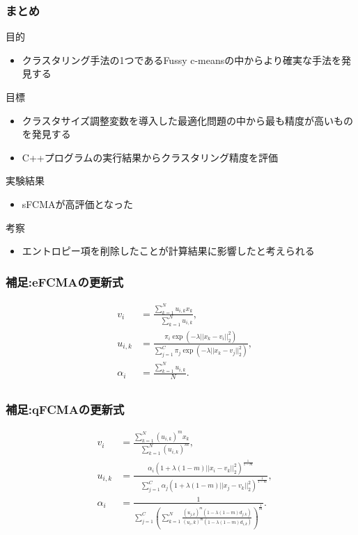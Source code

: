 \documentclass[13pt,dvipdfmx]{beamer}
\begin{document}
\begin{frame}\frametitle{まとめ}
  \begin{block}{目的}
    \begin{itemize}
    \item クラスタリング手法の1つであるFussy c-meansの中からより確実な手法を発見する
    \end{itemize}
  \end{block}
  \begin{block}{目標}
    \begin{itemize}
     \item クラスタサイズ調整変数を導入した最適化問題の中から最も精度が高いものを発見する
     \item C++プログラムの実行結果からクラスタリング精度を評価
    \end{itemize}
  \end{block}
  \begin{block}{実験結果}
    \begin{itemize}
    \item sFCMAが高評価となった
    \end{itemize}
  \end{block}
  \begin{block}{考察}
    \begin{itemize}
    \item エントロピー項を削除したことが計算結果に影響したと考えられる
    \end{itemize}
  \end{block}
\end{frame}

\begin{frame}\frametitle{補足:eFCMAの更新式}
   \begin{eqnarray*}
   &v_{i}& =\frac{\sum_{k=1}^Nu_{i,k}x_{k}}{\quad\sum_{k=1}^Nu_{i,k}},\\
   &u_{i,k}&=\frac{\pi_{i}\exp(-\lambda||x_k-v_i||_2^2)}{\sum_{j=1}^C\pi_{j}\exp(-\lambda||x_k-v_j||_2^2)},\\
   &\alpha_{i}&=\frac{\sum_{k=1}^Nu_{i,k}}{\quad N}.\\
   \end{eqnarray*}
\end{frame}

\begin{frame}\frametitle{補足:qFCMAの更新式}
  \begin{eqnarray*}
    &v_{i}&=\frac{\sum_{k=1}^N(u_{i,k})^mx_{k}}{\quad\sum_{k=1}^N(u_{i,k})^{m}},\quad\\
    &u_{i,k}&=\frac{\alpha_{i}(1+\lambda(1-m)||x_i-v_k||_2^2)^\frac{1}{1-m}}{\quad\sum_{j=1}^C\alpha_{j}(1+\lambda(1-m)||x_j-v_k||_2^2)^\frac{1}{1-m}},\\
    & \alpha_{i}&=\frac{1}{\sum_{j=1}^C\left(\sum_{k=1}^N\frac{(u_{j,k})^m(1-\lambda(1-m)d_{j,k})}{(u_i,k)^m(1-\lambda(1-m)d_{i,k})}\right)^{\frac{1}{m}}}.\\
      \end{eqnarray*}
\end{frame}
\end{document}
